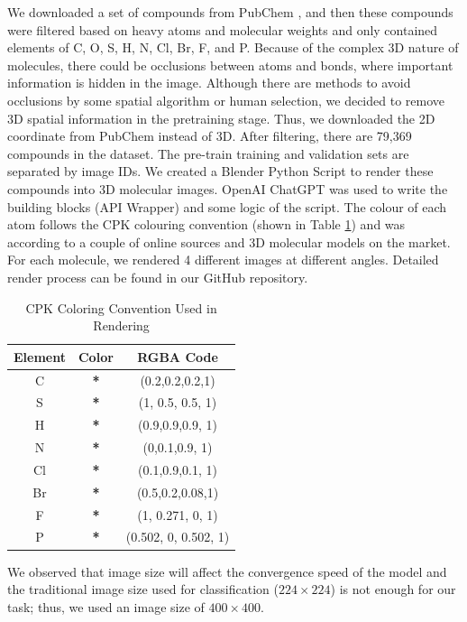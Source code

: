 \documentclass[12pt]{article}
\begin{document}
We downloaded a set of compounds from PubChem \autocite{kim_pubchem_2023}, and then these compounds were filtered based on heavy atoms and molecular weights and only contained elements of C, O, S, H, N, Cl, Br, F, and P. Because of the complex 3D nature of molecules, there could be occlusions between atoms and bonds, where important information is hidden in the image. Although there are methods to avoid occlusions by some spatial algorithm or human selection, we decided to remove 3D spatial information in the pretraining stage. Thus, we downloaded the 2D coordinate from PubChem instead of 3D.  
After filtering, there are 79,369 compounds in the dataset. The pre-train training and validation sets are separated by image IDs. We created a Blender Python Script to render these compounds into 3D molecular images. OpenAI ChatGPT was used to write the building blocks (API Wrapper) and some logic of the script. The colour of each atom follows the CPK colouring convention (shown in Table \ref{cpk}) and was according to a couple of online sources and 3D molecular models on the market. For each molecule, we rendered 4 different images at different angles. Detailed render process can be found in our GitHub repository. 
\begin{table}[]
    \centering
    \begin{tabular}{c|c|c}
        Element & Color & RGBA Code \\ \hline
C & \textcolor{color0}{\textbf{*}} & (0.2,0.2,0.2,1)\\
S & \textcolor{color2}{\textbf{*}} & (1, 0.5, 0.5, 1)\\
H & \textcolor{color3}{\textbf{*}} & (0.9,0.9,0.9, 1)\\
N & \textcolor{color4}{\textbf{*}} & (0,0.1,0.9, 1)\\
Cl &  \textcolor{color5}{\textbf{*}} & (0.1,0.9,0.1, 1)\\
Br & \textcolor{color6}{\textbf{*}} & (0.5,0.2,0.08,1)\\
F & \textcolor{color7}{\textbf{*}} & (1, 0.271, 0, 1)\\
P & \textcolor{color8}{\textbf{*}} & (0.502, 0, 0.502, 1)\\
    \end{tabular}
    \caption{CPK Coloring Convention Used in Rendering}
    \label{cpk}
\end{table}
We observed that image size will affect the convergence speed of the model and the traditional image size used for classification ($224\times224$) is not enough for our task; thus, we used an image size of $400\times400$. 
\end{document}
